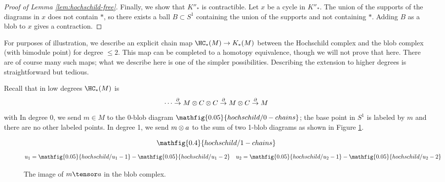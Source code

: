 \begin{proof}[Proof of Lemma \ref{lem:hochschild-free}]
Finally, we show that $K''_*$ is contractible.
Let $x$ be a cycle in $K''_*$.
The union of the supports of the diagrams in $x$ does not contain $*$, so there exists a
ball $B \subset S^1$ containing the union of the supports and not containing $*$.
Adding $B$ as a blob to $x$ gives a contraction.
\end{proof}

\medskip

For purposes of illustration, we describe an explicit chain map
$\HC_*(M) \to K_*(M)$
between the Hochschild complex and the blob complex (with bimodule point)
for degree $\le 2$.
This map can be completed to a homotopy equivalence, though we will not prove that here.
There are of course many such maps; what we describe here is one of the simpler possibilities.
Describing the extension to higher degrees is straightforward but tedious.

Recall that in low degrees $\HC_*(M)$ is
\[
	\cdots \stackrel{\partial}{\to} M \otimes C\otimes C \stackrel{\partial}{\to} 
			M \otimes C \stackrel{\partial}{\to} M
\]
with
In degree 0, we send $m\in M$ to the 0-blob diagram $\mathfig{0.05}{hochschild/0-chains}$; the base point
in $S^1$ is labeled by $m$ and there are no other labeled points.
In degree 1, we send $m\otimes a$ to the sum of two 1-blob diagrams
as shown in Figure \ref{fig:hochschild-1-chains}.

\begin{figure}[!ht]
\begin{equation*}
\mathfig{0.4}{hochschild/1-chains}
\end{equation*}
\begin{align*}
u_1 & = \mathfig{0.05}{hochschild/u_1-1} - \mathfig{0.05}{hochschild/u_1-2} & u_2 & = \mathfig{0.05}{hochschild/u_2-1} - \mathfig{0.05}{hochschild/u_2-2} 
\end{align*}
\caption{The image of $m \tensor a$ in the blob complex.}
\label{fig:hochschild-1-chains}
\end{figure}

